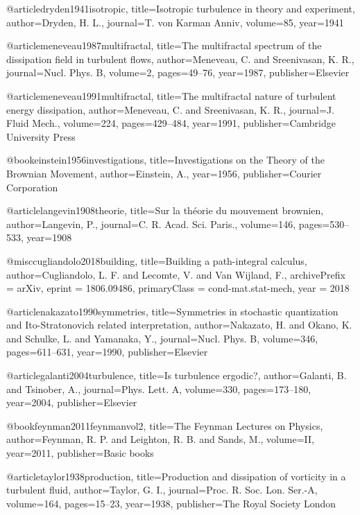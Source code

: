   @article{dryden1941isotropic,
  title={{Isotropic turbulence in theory and experiment}},
  author={Dryden, H. L.},
  journal={T. von Karman Anniv},
  volume={85},
  year={1941}
  }

  @article{meneveau1987multifractal,
    title={{The multifractal spectrum of the dissipation field in turbulent flows}},
    author={Meneveau, C. and Sreenivasan, K. R.},
    journal={Nucl. Phys. B},
    volume={2},
    pages={49--76},
    year={1987},
    publisher={Elsevier}
  }

  @article{meneveau1991multifractal,
    title={{The multifractal nature of turbulent energy dissipation}},
    author={Meneveau, C. and Sreenivasan, K. R.},
    journal={J. Fluid Mech.},
    volume={224},
    pages={429--484},
    year={1991},
    publisher={Cambridge University Press}
  }

  @book{einstein1956investigations,
    title={{Investigations on the Theory of the Brownian Movement}},
    author={Einstein, A.},
    year={1956},
    publisher={Courier Corporation}
  }

  @article{langevin1908theorie,
    title={{Sur la th{\'e}orie du mouvement brownien}},
    author={Langevin, P.},
    journal={C. R. Acad. Sci. Paris.},
    volume={146},
    pages={530--533},
    year={1908}
  }

  @misc{cugliandolo2018building,
    title={Building a path-integral calculus},
    author={Cugliandolo, L. F. and Lecomte, V. and Van Wijland, F.},
    archivePrefix = {arXiv},
    eprint        = {1806.09486},
    primaryClass  = {cond-mat.stat-mech},
    year = {2018}
  }

  @article{nakazato1990symmetries,
    title={{Symmetries in stochastic quantization and Ito-Stratonovich related interpretation}},
    author={Nakazato, H. and Okano, K. and Schulke, L. and Yamanaka, Y.},
    journal={Nucl. Phys. B},
    volume={346},
    pages={611--631},
    year={1990},
    publisher={Elsevier}
  }

  @article{galanti2004turbulence,
    title={{Is turbulence ergodic?}},
    author={Galanti, B. and Tsinober, A.},
    journal={Phys. Lett. A},
    volume={330},
    pages={173--180},
    year={2004},
    publisher={Elsevier}
  }

  @book{feynman2011feynmanvol2,
    title={{The Feynman Lectures on Physics}},
    author={Feynman, R. P. and Leighton, R. B. and Sands, M.},
    volume={II},
    year={2011},
    publisher={Basic books}
  }

  @article{taylor1938production,
    title={{Production and dissipation of vorticity in a turbulent fluid}},
    author={Taylor, G. I.},
    journal={Proc. R. Soc. Lon. Ser.-A},
    volume={164},
    pages={15--23},
    year={1938},
    publisher={The Royal Society London}
  }

